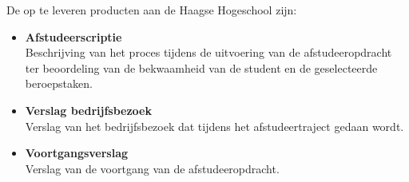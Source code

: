 De op te leveren producten aan de Haagse Hogeschool zijn:
\begin{itemize}
  \item{\textbf{Afstudeerscriptie}}
  \\ Beschrijving van het proces tijdens de uitvoering van de afstudeeropdracht ter beoordeling van de bekwaamheid van de student en de geselecteerde beroepstaken.
  \item{\textbf{Verslag bedrijfsbezoek}}
  \\ Verslag van het bedrijfsbezoek dat tijdens het afstudeertraject gedaan wordt.
  \item{\textbf{Voortgangsverslag}}
  \\ Verslag van de voortgang van de afstudeeropdracht.
\end{itemize}



